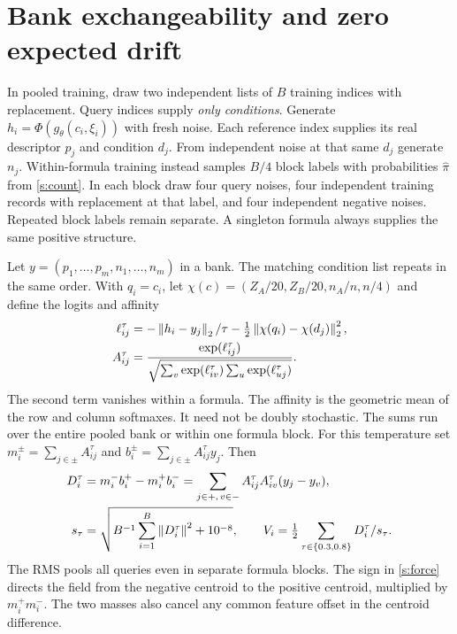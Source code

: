 \section{Bank exchangeability and zero expected drift}\label{s:banks}
In pooled training, draw two independent lists of $B$ training indices with replacement. Query indices supply \emph{only conditions}. Generate $h_i=\Phi(g_\theta(c_i,\xi_i))$ with fresh noise. Each reference index supplies its real descriptor $p_j$ and condition $d_j$. From independent noise at that same $d_j$ generate $n_j$. Within-formula training instead samples $B/4$ block labels with probabilities $\widehat\pi$ from \eqref{s:count}. In each block draw four query noises, four independent training records with replacement at that label, and four independent negative noises. Repeated block labels remain separate. A singleton formula always supplies the same positive structure.

Let $y=(p_1,\ldots,p_m,n_1,\ldots,n_m)$ in a bank. The matching condition list repeats in the same order. With $q_i=c_i$, let $\chi(c)=(Z_A/20,Z_B/20,n_A/n,n/4)$ and define the logits and affinity
\begin{align}
 \ell_{ij}^{\tau}
 &=-\left\lVert h_i-y_j\right\rVert_2/\tau-\tfrac12\left\lVert \chi(q_i)-\chi(d_j)\right\rVert_2^2, \label{s:logits}\\
 A_{ij}^{\tau}
 &=\frac{\exp(\ell_{ij}^{\tau})}{\sqrt{\sum_v\exp(\ell_{iv}^{\tau})\sum_u\exp(\ell_{uj}^{\tau})}}.
 \label{s:a}
\end{align}
The second term vanishes within a formula. The affinity is the geometric mean of the row and column softmaxes. It need not be doubly stochastic. The sums run over the entire pooled bank or within one formula block. For this temperature set $m_i^\pm=\sum_{j\in\pm}A_{ij}^{\tau}$ and $b_i^\pm=\sum_{j\in\pm}A_{ij}^{\tau}y_j$. Then
\begin{align}
 D_i^\tau
 &=m_i^- b_i^+-m_i^+ b_i^-
   =\sum_{j\in+,\,v\in-} A_{ij}^\tau A_{iv}^\tau(y_j-y_v), \label{s:force}\\
 s_\tau&=\sqrt{B^{-1}\sum_{i=1}^{B}\left\lVert D_i^\tau\right\rVert^2+10^{-8}},
 \qquad V_i=\tfrac12\sum_{\tau\in\{0.3,0.8\}}D_i^\tau/s_\tau . \label{s:rms}
\end{align}
The RMS pools all queries even in separate formula blocks. The sign in \eqref{s:force} directs the field from the negative centroid to the positive centroid, multiplied by $m_i^+m_i^-$. The two masses also cancel any common feature offset in the centroid difference.

